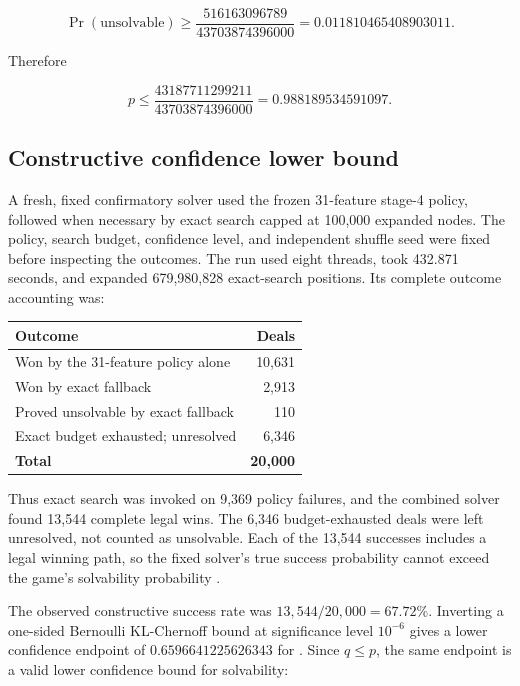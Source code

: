 \documentclass[11pt]{article}
\begin{document}
\[
\Pr(\text{unsolvable})\ge
\frac{516163096789}{43703874396000}
=0.011810465408903011.
\]

Therefore

\[
p\le \frac{43187711299211}{43703874396000}
=0.988189534591097.
\]

\subsection{Constructive confidence lower bound}

A fresh, fixed confirmatory solver used the frozen 31-feature stage-4 policy, followed when necessary by exact search capped at 100,000 expanded nodes. The policy, search budget, confidence level, and independent shuffle seed were fixed before inspecting the outcomes. The run used eight threads, took 432.871 seconds, and expanded 679,980,828 exact-search positions. Its complete outcome accounting was:

\begin{center}
\begin{tabularx}{0.78\textwidth}{@{}Y r@{}}
\toprule
\textbf{Outcome} & \textbf{Deals} \\
\midrule
Won by the 31-feature policy alone & 10,631 \\
Won by exact fallback & 2,913 \\
Proved unsolvable by exact fallback & 110 \\
Exact budget exhausted; unresolved & 6,346 \\
\textbf{Total} & \textbf{20,000} \\
\bottomrule
\end{tabularx}
\end{center}

Thus exact search was invoked on 9,369 policy failures, and the combined solver found 13,544 complete legal wins. The 6,346 budget-exhausted deals were left unresolved, not counted as unsolvable. Each of the 13,544 successes includes a legal winning path, so the fixed solver's true success probability \texttt{} cannot exceed the game's solvability probability \texttt{}.

The observed constructive success rate was $13{,}544/20{,}000=67.72\%$. Inverting a one-sided Bernoulli KL-Chernoff bound at significance level $10^{-6}$ gives a lower confidence endpoint of $0.6596641225626343$ for \texttt{}. Since $q\le p$, the same endpoint is a valid lower confidence bound for solvability:
\end{document}

